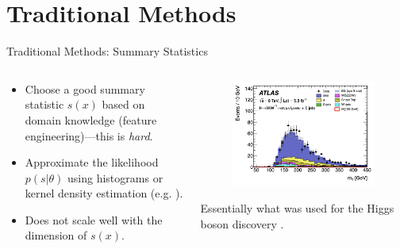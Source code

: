 \documentclass[12pt, aspectratio=169]{beamer}
\let\olditem\item
\renewcommand\item{\olditem\justifying}
\begin{document}
\section{Traditional Methods}
\begin{frame}{Traditional Methods: Summary Statistics}

    \begin{columns}
		\begin{column}{0.45\textwidth}
        \begin{itemize}
            \item Choose a good summary statistic $s(x)$ based on domain knowledge (feature engineering)---this is \textit{hard}.
            
            \pause
            
            \item Approximate the likelihood $p(s|\theta)$ using histograms or kernel density estimation (e.g. \cite{diggle_monte_1984}).

            \pause 
            
            \item Does not scale well with the dimension of $s(x)$.
        \end{itemize}
        
        \end{column}

        \pause

        \begin{column}{0.55\textwidth}
            \begin{figure}
    			\centering
    			\includegraphics[width=0.75\linewidth]{"images/atlas_histogram.png"}\label{fig:g4}
            \end{figure}
            \vspace{-0.98em}
            Essentially what was used for the Higgs boson discovery \parencite{atlas_collaboration_observation_2012}.
        \end{column}
    \end{columns}

\end{frame}
\end{document}
